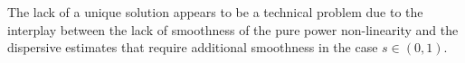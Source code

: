 \documentclass[12pt,a4paper]{amsart}
\numberwithin{equation}{section}
\begin{document}
	The lack of a unique solution appears to be a technical problem due to the interplay between the lack of smoothness of the pure power non-linearity and the dispersive estimates that require additional smoothness in the case $s \in (0,1) $.
	
	
	
	
	\printbibliography
	
	\doclicenseThis
\end{document}
